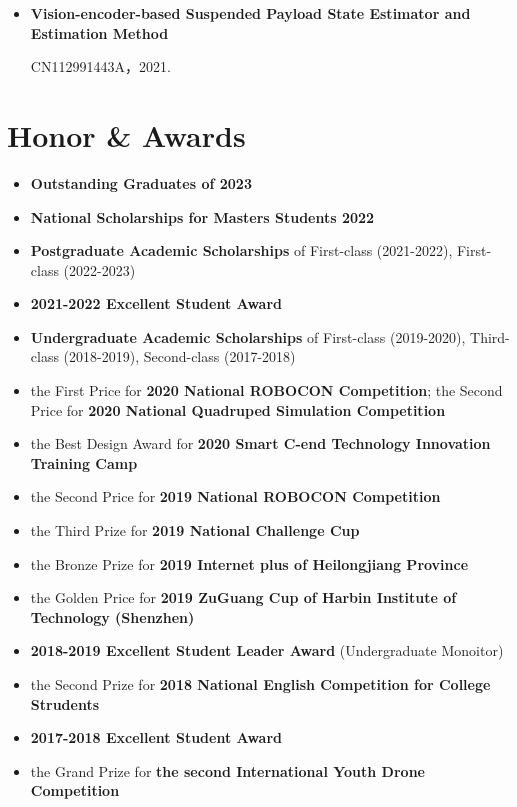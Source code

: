 \documentclass[11pt,a4paper,sans]{moderncv}        %
\begin{document}
\begin{itemize}
    \item{\textbf{Vision-encoder-based Suspended Payload State Estimator and Estimation Method}
    
    CN112991443A，2021.
    }

\end{itemize}

\section{Honor \& Awards}


\begin{itemize}

    \item{\textbf{Outstanding Graduates of 2023}}
    \item {\textbf{National Scholarships for Masters Students 2022}}

    \item{\textbf{Postgraduate Academic Scholarships} of First-class (2021-2022), First-class (2022-2023)}
    \item {\textbf{2021-2022 Excellent Student Award}}
    \item{\textbf{Undergraduate Academic Scholarships} of First-class (2019-2020), Third-class (2018-2019), Second-class (2017-2018)}
    
    \item{the First Price for \textbf{2020 National ROBOCON Competition}; the Second Price for \textbf{2020 National Quadruped Simulation Competition}}
    
    \item {the Best Design Award for \textbf{2020 Smart C-end Technology Innovation Training Camp}}
    
    \item{the Second Price for \textbf{2019 National ROBOCON Competition}}
    
    \item{the Third Prize for \textbf{2019 National Challenge Cup}}
    
    \item{the Bronze Prize for \textbf{2019 Internet plus of Heilongjiang Province}}
    \item{the Golden Price for \textbf{2019 ZuGuang Cup of Harbin Institute of Technology (Shenzhen)}}
    
    \item {\textbf{2018-2019 Excellent Student Leader Award} (Undergraduate Monoitor)}
    
    \item{the Second Prize for \textbf{2018 National English Competition for College Strudents}}
    \item {\textbf{2017-2018 Excellent Student Award}}
    
    \item{the Grand Prize for \textbf{the second International Youth Drone Competition}}
\end{itemize}
\end{document}
